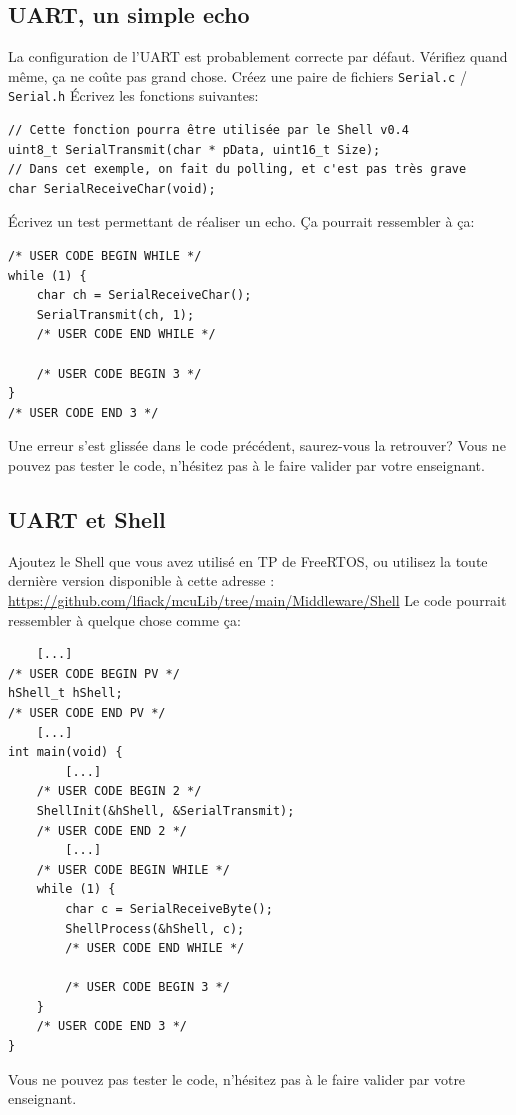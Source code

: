\documentclass[12pt,%
addpoints,%
]{exam}
\begin{document}
\subsection{UART, un simple echo}
\begin{questions}
	\question La configuration de l'UART est probablement correcte par défaut. Vérifiez quand même, ça ne coûte pas grand chose.
	\question Créez une paire de fichiers \texttt{Serial.c} / \texttt{Serial.h}
	\question Écrivez les fonctions suivantes:
	\begin{verbatim}
// Cette fonction pourra être utilisée par le Shell v0.4
uint8_t SerialTransmit(char * pData, uint16_t Size);
// Dans cet exemple, on fait du polling, et c'est pas très grave
char SerialReceiveChar(void);
	\end{verbatim}
	\question Écrivez un test permettant de réaliser un echo. Ça pourrait ressembler à ça:
	\begin{verbatim}
/* USER CODE BEGIN WHILE */
while (1) {
    char ch = SerialReceiveChar();
    SerialTransmit(ch, 1);
    /* USER CODE END WHILE */

    /* USER CODE BEGIN 3 */
}
/* USER CODE END 3 */
	\end{verbatim}
	\question Une erreur s'est glissée dans le code précédent, saurez-vous la retrouver?
	\question Vous ne pouvez pas tester le code, n'hésitez pas à le faire valider par votre enseignant.
\end{questions}

\subsection{UART et Shell}
\begin{questions}
	\question Ajoutez le Shell que vous avez utilisé en TP de FreeRTOS, ou utilisez la toute dernière version disponible à cette adresse : \url{https://github.com/lfiack/mcuLib/tree/main/Middleware/Shell}
	\question Le code pourrait ressembler à quelque chose comme ça:
	\begin{verbatim}
    [...]
/* USER CODE BEGIN PV */
hShell_t hShell;
/* USER CODE END PV */
    [...]
int main(void) {
        [...]
    /* USER CODE BEGIN 2 */
    ShellInit(&hShell, &SerialTransmit);
    /* USER CODE END 2 */
        [...]
    /* USER CODE BEGIN WHILE */
    while (1) {
        char c = SerialReceiveByte();
        ShellProcess(&hShell, c);
        /* USER CODE END WHILE */

        /* USER CODE BEGIN 3 */
    }
    /* USER CODE END 3 */
}

	\end{verbatim}
	\question Vous ne pouvez pas tester le code, n'hésitez pas à le faire valider par votre enseignant.
\end{questions}
\end{document}
